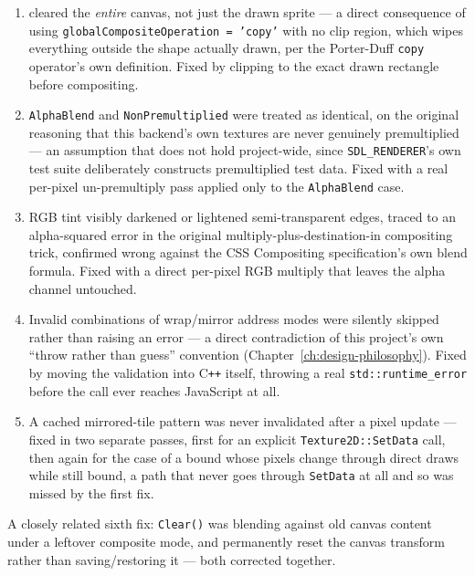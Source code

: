 \begin{enumerate}
  \item {} cleared the \emph{entire} canvas, not just the drawn
        sprite --- a direct consequence of using \texttt{globalCompositeOperation = 'copy'}
        with no clip region, which wipes everything outside the shape actually drawn, per the
        Porter-Duff \texttt{copy} operator's own definition. Fixed by clipping to the exact
        drawn rectangle before compositing.
  \item \texttt{AlphaBlend} and \texttt{NonPremultiplied} were treated as identical, on the
        original reasoning that this backend's own textures are never genuinely
        premultiplied --- an assumption that does not hold project-wide, since
        \texttt{SDL\_RENDERER}'s own test suite deliberately constructs premultiplied test
        data. Fixed with a real per-pixel un-premultiply pass applied only to the
        \texttt{AlphaBlend} case.
  \item RGB tint visibly darkened or lightened semi-transparent edges, traced to an
        alpha-squared error in the original multiply-plus-destination-in compositing trick,
        confirmed wrong against the CSS Compositing specification's own blend formula. Fixed
        with a direct per-pixel RGB multiply that leaves the alpha channel untouched.
  \item Invalid combinations of wrap/mirror address modes were silently skipped rather than
        raising an error --- a direct contradiction of this project's own ``throw rather than
        guess'' convention (Chapter~\ref{ch:design-philosophy}). Fixed by moving the
        validation into C\texttt{++} itself, throwing a real \texttt{std::runtime\_error}
        before the call ever reaches JavaScript at all.
  \item A cached mirrored-tile pattern was never invalidated after a pixel update --- fixed
        in two separate passes, first for an explicit \texttt{Texture2D::SetData} call, then
        again for the case of a bound  whose pixels change through
        direct draws while still bound, a path that never goes through \texttt{SetData} at
        all and so was missed by the first fix.
\end{enumerate}

A closely related sixth fix: \texttt{Clear()} was blending against old canvas content under a
leftover composite mode, and permanently reset the canvas transform rather than
saving/restoring it --- both corrected together.

